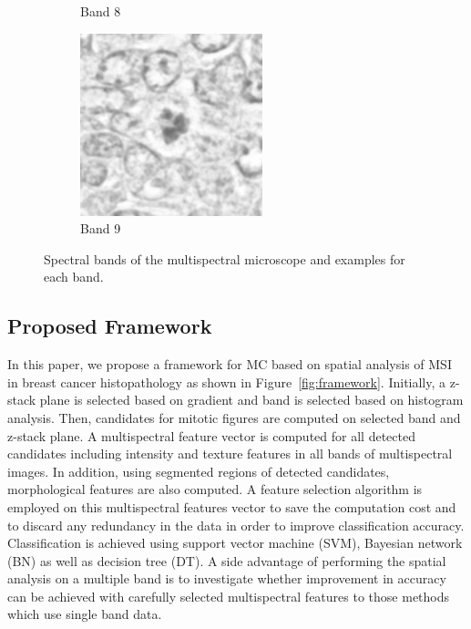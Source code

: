 \documentclass[10pt,twocolumn,letterpaper]{article}
\begin{document}
\begin{figure}[t]
\begin{subfigure}[b]{0.11\textwidth}
		\caption*{Band 8}
	\end{subfigure}
	\begin{subfigure}[b]{0.11\textwidth}
		\centering
		\includegraphics[width=\textwidth]{img/M03_00a_0908_m1.png}
		\caption*{Band 9}
	\end{subfigure}
	\caption{Spectral bands of the multispectral microscope and examples for each band.}
	\label{fig:spectral_bands}	
\end{figure}

\subsection{Proposed Framework}
In this paper, we propose a framework for MC based on spatial analysis of MSI in breast cancer histopathology as shown in Figure~\ref{fig:framework}. Initially, a z-stack plane is selected based on gradient and band is selected based on histogram analysis. Then, candidates for mitotic figures are computed on selected band and z-stack plane. A multispectral feature vector is computed for all detected candidates including intensity and texture features in all bands of multispectral images. In addition, using segmented regions of detected candidates, morphological features are also computed. A feature selection algorithm is employed on this multispectral features vector to save the computation cost and to discard any redundancy in the data in order to improve classification accuracy. Classification is achieved using support vector machine (SVM), Bayesian network (BN) as well as decision tree (DT). A side advantage of performing the spatial analysis on a multiple band is to investigate whether improvement in accuracy can be achieved with carefully selected multispectral features to those methods \cite{masood2009,wu2009,wu2012} which use single band data.
\end{document}
